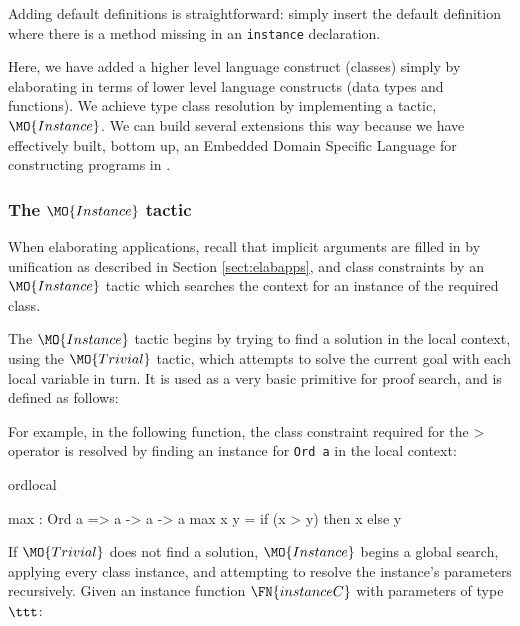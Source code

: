 Adding default definitions is straightforward: simply insert the default definition where
there is a method missing in an \texttt{instance} declaration.

Here, we have added a higher level language construct
(classes) simply by elaborating in terms of lower level language constructs
(data types and functions).  We achieve type class resolution by implementing a
tactic, $\MO{Instance}$.  We can build several extensions this way because we
have effectively built, bottom up, an Embedded Domain Specific Language for
constructing programs in \TT{}.

\subsubsection{The $\MO{Instance}$ tactic}

\label{sect:instance}

When elaborating applications, recall that implicit arguments are filled in by
unification as described in Section \ref{sect:elabapps}, and class
constraints by an $\MO{Instance}$ tactic which searches the context for an
instance of the required class. 

The $\MO{Instance}$ tactic begins by trying to find a solution in the local context,
using the $\MO{Trivial}$ tactic, which attempts
to solve the current goal with each local variable in turn. It is used as a very
basic primitive for proof search, and is defined as follows:


For example, in the following function, the class constraint required for
the $\texttt{>}$ operator is resolved by finding an instance for \texttt{Ord a}
in the local context:

\begin{SaveVerbatim}{ordlocal}

max : Ord a => a -> a -> a
max x y = if (x > y) then x else y

\end{SaveVerbatim}

If $\MO{Trivial}$ does not find a solution, $\MO{Instance}$ begins a global search,
applying every class instance, and attempting to resolve the instance's parameters
recursively. Given an instance function $\FN{instanceC}$ with parameters
of type $\ttt$:

